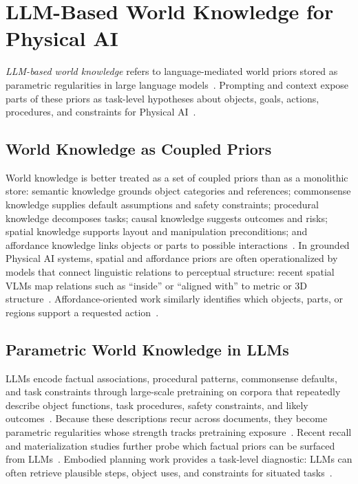 \section{LLM-Based World Knowledge for Physical AI}
\label{sec:world-knowledge}

\emph{LLM-based world knowledge} refers to language-mediated world priors stored as parametric regularities in large language models~\citep{petroni2019language,roberts2020knowledge}.
Prompting and context expose parts of these priors as task-level hypotheses about objects, goals, actions, procedures, and constraints for Physical AI~\citep{brown2020language,wei2022chain}.

\subsection{World Knowledge as Coupled Priors}

World knowledge is better treated as a set of coupled priors than as a monolithic store: semantic knowledge grounds object categories and references; commonsense knowledge supplies default assumptions and safety constraints; procedural knowledge decomposes tasks; causal knowledge suggests outcomes and risks; spatial knowledge supports layout and manipulation preconditions; and affordance knowledge links objects or parts to possible interactions~\citep{arkin1990integrating,hagoort2004integration,schwenk2022okvqa}. 
In grounded Physical AI systems, spatial and affordance priors are often operationalized by models that connect linguistic relations to perceptual structure: recent spatial VLMs map relations such as ``inside'' or ``aligned with'' to metric or 3D structure~\citep{chen2024spatialvlm,yuan2024robopoint,song2025robospatial}. 
Affordance-oriented work similarly identifies which objects, parts, or regions support a requested action~\citep{qian2024affordancellm,huang2024manipvqa,chu2025threedaffordancellm}.

\subsection{Parametric World Knowledge in LLMs}

LLMs encode factual associations, procedural patterns, commonsense defaults, and task constraints through large-scale pretraining on corpora that repeatedly describe object functions, task procedures, safety constraints, and likely outcomes~\citep{petroni2019language,roberts2020knowledge,brown2020language,bommasani2021foundation}.
Because these descriptions recur across documents, they become parametric regularities whose strength tracks pretraining exposure~\citep{kandpal2023longtail,chang2024factualpretraining}.
Recent recall and materialization studies further probe which factual priors can be surfaced from LLMs~\citep{yuan2024factbench,hu2024gptkb}.
Embodied planning work provides a task-level diagnostic: LLMs can often retrieve plausible steps, object uses, and constraints for situated tasks~\citep{song2023llmplanner,rana2023sayplan,hua2024gensim2}.


